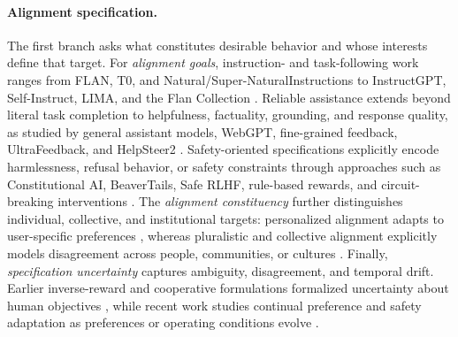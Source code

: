 \documentclass[10pt,a4paper,twocolumn]{article}
\begin{document}
\paragraph{Alignment specification.}
The first branch asks what constitutes desirable behavior and whose interests define that target. For \emph{alignment goals}, instruction- and task-following work ranges from FLAN, T0, and Natural/Super-NaturalInstructions to InstructGPT, Self-Instruct, LIMA, and the Flan Collection \citep{wei2022flan,sanh2022t0,mishra2022natural,wang2022superni,ouyang2022instructgpt,wang2023selfinstruct,zhou2023lima,longpre2023flancollection}. Reliable assistance extends beyond literal task completion to helpfulness, factuality, grounding, and response quality, as studied by general assistant models, WebGPT, fine-grained feedback, UltraFeedback, and HelpSteer2 \citep{askell2021assistant,bai2022hh,glaese2022sparrow,nakano2021webgpt,wu2023finegrained,cui2024ultrafeedback,wang2024helpsteer2}. Safety-oriented specifications explicitly encode harmlessness, refusal behavior, or safety constraints through approaches such as Constitutional AI, BeaverTails, Safe RLHF, rule-based rewards, and circuit-breaking interventions \citep{bai2022constitutional,ji2023beavertails,dai2024saferlhf,mu2024rulebased,zou2024circuitbreakers}. The \emph{alignment constituency} further distinguishes individual, collective, and institutional targets: personalized alignment adapts to user-specific preferences \citep{jang2023personalizedsoups,li2024personalized,poddar2024personalizing,zhang2025personajudge}, whereas pluralistic and collective alignment explicitly models disagreement across people, communities, or cultures \citep{bakker2022finetuning,siththaranjan2024distributional,huang2024collective,kirk2024prism,li2024culturellm,feng2024modular,sorensen2024pluralistic,adams2025steerable}. Finally, \emph{specification uncertainty} captures ambiguity, disagreement, and temporal drift. Earlier inverse-reward and cooperative formulations formalized uncertainty about human objectives \citep{hadfieldmenell2016cirl,hadfieldmenell2017ird,hadfieldmenell2017offswitch}, while recent work studies continual preference and safety adaptation as preferences or operating conditions evolve \citep{zhang2025copr,wang2025lifelong}.
\end{document}
